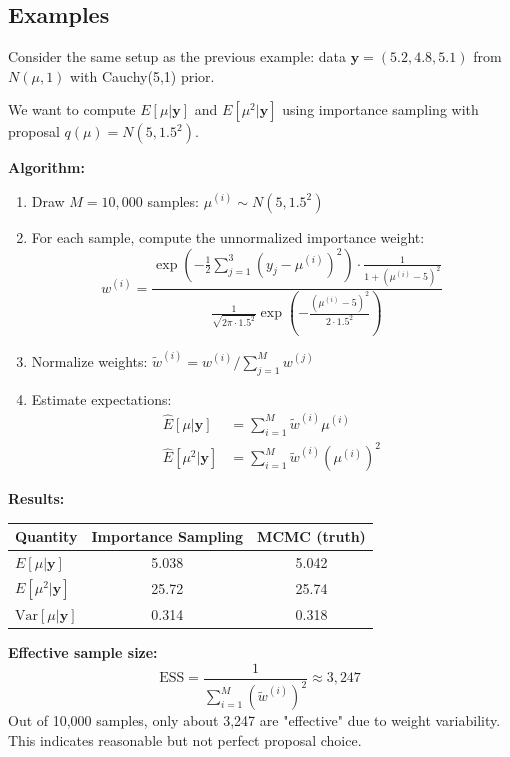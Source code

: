 \subsection{Examples}
\begin{examplebox}
\begin{example}
Consider the same setup as the previous example: data $\mathbf{y} = (5.2, 4.8, 5.1)$ from $N(\mu, 1)$ with Cauchy(5,1) prior.

We want to compute $E[\mu|\mathbf{y}]$ and $E[\mu^2|\mathbf{y}]$ using importance sampling with proposal $q(\mu) = N(5, 1.5^2)$.

\textbf{Algorithm:}
\begin{enumerate}
\item Draw $M = 10{,}000$ samples: $\mu^{(i)} \sim N(5, 1.5^2)$
\item For each sample, compute the unnormalized importance weight:
$$w^{(i)} = \frac{\exp\left(-\frac{1}{2}\sum_{j=1}^3(y_j - \mu^{(i)})^2\right) \cdot \frac{1}{1 + (\mu^{(i)}-5)^2}}{\frac{1}{\sqrt{2\pi \cdot 1.5^2}}\exp\left(-\frac{(\mu^{(i)}-5)^2}{2 \cdot 1.5^2}\right)}$$
\item Normalize weights: $\tilde{w}^{(i)} = w^{(i)} / \sum_{j=1}^M w^{(j)}$
\item Estimate expectations:
\begin{align*}
\hat{E}[\mu|\mathbf{y}] &= \sum_{i=1}^M \tilde{w}^{(i)} \mu^{(i)} \\
\hat{E}[\mu^2|\mathbf{y}] &= \sum_{i=1}^M \tilde{w}^{(i)} (\mu^{(i)})^2
\end{align*}
\end{enumerate}

\textbf{Results:}
\begin{center}
\begin{tabular}{lcc}
\toprule
Quantity & Importance Sampling & MCMC (truth) \\
\midrule
$E[\mu|\mathbf{y}]$ & 5.038 & 5.042 \\
$E[\mu^2|\mathbf{y}]$ & 25.72 & 25.74 \\
$\text{Var}[\mu|\mathbf{y}]$ & 0.314 & 0.318 \\
\bottomrule
\end{tabular}
\end{center}
\textbf{Effective sample size:}
$$\text{ESS} = \frac{1}{\sum_{i=1}^M (\tilde{w}^{(i)})^2} \approx 3{,}247$$
Out of 10,000 samples, only about 3,247 are "effective" due to weight variability. This indicates reasonable but not perfect proposal choice.
\end{example}
\end{examplebox}

